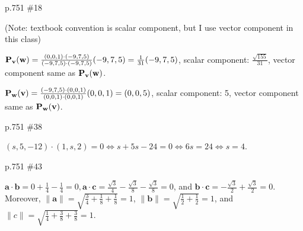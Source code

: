 \begin{practice}p.751 \#18\end{practice}
\begin{pracsol}
  (Note: textbook convention is scalar component, but I use vector component in this class)

  $\mathbf P_\mathbf v(\mathbf w)=\frac{(0,0,1)\cdot(-9,7,5)}{(-9,7,5)\cdot(-9,7,5)}(-9,7,5)=\frac{1}{31}(-9,7,5)$, scalar component: $\frac{\sqrt{155}}{31}$, vector component same as $\mathbf P_\mathbf v(\mathbf w)$.

  $\mathbf P_\mathbf w(\mathbf v)=\frac{(-9,7,5)\cdot(0,0,1)}{(0,0,1)\cdot(0,0,1)}(0,0,1)=(0,0,5)$, scalar component: 5, vector component same as $\mathbf P_\mathbf w(\mathbf v)$.
\end{pracsol}
\begin{practice}p.751 \#38\end{practice}
\begin{pracsol}
  $(s,5,-12)\cdot(1,s,2)=0\iff s+5s-24=0\iff 6s=24\iff s=4$.
\end{pracsol}
\begin{practice}p.751 \#43\end{practice}
\begin{pracsol}
  $\mathbf a\cdot\mathbf b=0+\frac14-\frac14=0, \mathbf a\cdot\mathbf c=\frac{\sqrt3}4-\frac{\sqrt3}8-\frac{\sqrt3}{8}=0$, and $\mathbf b\cdot\mathbf c=-\frac{\sqrt3}{2}+\frac{\sqrt3}{2}=0$. Moreover, $\|\mathbf a\|=\sqrt{\frac34+\frac18+\frac18}=1$, $\|\mathbf b\|=\sqrt{\frac12+\frac12}=1$, and $\|c\|=\sqrt{\frac14+\frac38+\frac38}=1$.
\end{pracsol}
